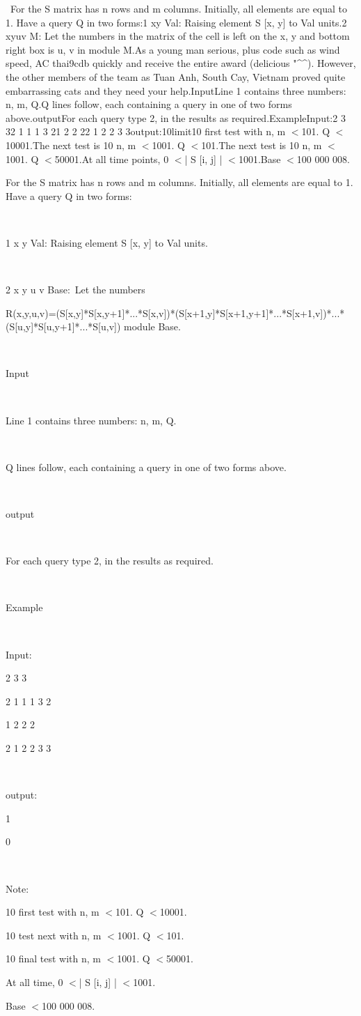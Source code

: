 

 For the S matrix has n rows and m columns. Initially, all elements are equal to 1. Have a query Q in two forms:1 xy Val: Raising element S [x, y] to Val units.2 xyuv M: Let the numbers in the matrix of the cell is left on the x, y and bottom right box is u, v in module M.As a young man serious, plus code such as wind speed, AC thai9cdb quickly and receive the entire award (delicious "\textasciicircum \textasciicircum). However, the other members of the team as Tuan Anh, South Cay, Vietnam proved quite embarrassing cats and they need your help.InputLine 1 contains three numbers: n, m, Q.Q lines follow, each containing a query in one of two forms above.outputFor each query type 2, in the results as required.ExampleInput:2 3 32 1 1 1 3 21 2 2 22 1 2 2 3 3output:10limit10 first test with n, m $<$101. Q $<$10001.The next test is 10 n, m $<$1001. Q $<$101.The next test is 10 n, m $<$1001. Q $<$50001.At all time points, 0 $<$| S [i, j] | $<$1001.Base $<$100 000 008.

For the S matrix has n rows and m columns. Initially, all elements are equal to 1. Have a query Q in two forms:

 

1 x y Val: Raising element S [x, y] to Val units.

 

2 x y u v Base: Let the numbers

R(x,y,u,v)=(S[x,y]*S[x,y+1]*...*S[x,v])*(S[x+1,y]*S[x+1,y+1]*...*S[x+1,v])*...*(S[u,y]*S[u,y+1]*...*S[u,v]) module Base.

 

Input

 

Line 1 contains three numbers: n, m, Q.

 

Q lines follow, each containing a query in one of two forms above.

 

output

 

For each query type 2, in the results as required.

 

Example

 

Input:

2 3 3

2 1 1 1 3 2

1 2 2 2

2 1 2 2 3 3

 

output:

1

0

 

Note:

10 first test with n, m $<$101. Q $<$10001.

10 test next with n, m $<$1001. Q $<$101.

10 final test with n, m $<$1001. Q $<$50001.

At all time, 0 $<$| S [i, j] | $<$1001.

Base $<$100 000 008.

 